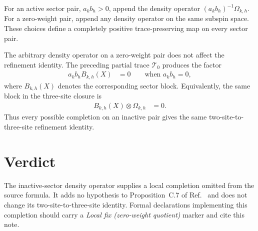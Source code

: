 \documentclass{article}
\begin{document}
For an active sector pair, $a_kb_h>0$, append the density operator
$(a_kb_h)^{-1}\Omega_{k,h}$. For a zero-weight pair, append any density
operator on the same subspin space. These choices define a completely positive
trace-preserving map on every sector pair.

The arbitrary density operator on a zero-weight pair does not affect the
refinement identity. The preceding partial trace $\mathcal T_0$ produces the
factor
\begin{align}
    a_kb_hB_{k,h}(X)
        &=0
        \qquad\text{when }a_kb_h=0,
    \label{eq:cpgsv17_mpdo_zero_weight_preparation_completion_zero_partial_trace}
\end{align}
where $B_{k,h}(X)$ denotes the corresponding sector block. Equivalently, the
same block in the three-site closure is
\begin{align}
    B_{k,h}(X)\otimes\Omega_{k,h}
        &=0.
    \label{eq:cpgsv17_mpdo_zero_weight_preparation_completion_zero_three_site_block}
\end{align}
Thus every possible completion on an inactive pair gives the same
two-site-to-three-site refinement identity.

\section{Verdict}

The inactive-sector density operator supplies a local completion omitted from
the source formula. It adds no hypothesis to Proposition~C.7 of
Ref.~\cite{Cirac2016MPDO_arXiv} and does not change its two-site-to-three-site
identity. Formal declarations implementing this completion should carry a
\emph{Local fix (zero-weight quotient)} marker and cite this note.



\end{document}
